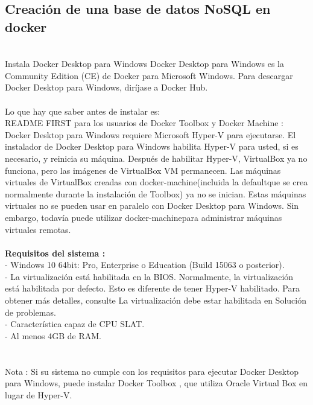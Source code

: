 \documentclass[twoside,onecolumn]{article}
\begin{document}
\begin{flushright}
\begin{itemize}
\subsection{Creación de una base de datos NoSQL en docker}
\textbf{}\\
Instala Docker Desktop para Windows
Docker Desktop para Windows es la Community Edition (CE) de Docker para Microsoft Windows. Para descargar Docker Desktop para Windows, diríjase a Docker Hub.
\textbf{}\\
\textbf{}\\
Lo que hay que saber antes de instalar es: \textbf{}\\
README FIRST para los usuarios de Docker Toolbox y Docker Machine : Docker Desktop para Windows requiere Microsoft Hyper-V para ejecutarse. El instalador de Docker Desktop para Windows habilita Hyper-V para usted, si es necesario, y reinicia su máquina. Después de habilitar Hyper-V, VirtualBox ya no funciona, pero las imágenes de VirtualBox VM permanecen. Las máquinas virtuales de VirtualBox creadas con docker-machine(incluida la defaultque se crea normalmente durante la instalación de Toolbox) ya no se inician. Estas máquinas virtuales no se pueden usar en paralelo con Docker Desktop para Windows. Sin embargo, todavía puede utilizar docker-machinepara administrar máquinas virtuales remotas.
\textbf{}\\
\textbf{}\\
\textbf{Requisitos del sistema :}\\
- Windows 10 64bit: Pro, Enterprise o Education (Build 15063 o posterior).\textbf{}\\
- La virtualización está habilitada en la BIOS. Normalmente, la virtualización está habilitada por defecto. Esto es diferente de tener Hyper-V habilitado. Para obtener más detalles, consulte La virtualización debe estar habilitada en Solución de problemas.\textbf{}\\
- Característica capaz de CPU SLAT.\textbf{}\\
- Al menos 4GB de RAM.\textbf{}\\
\textbf{}\\
\textbf{}\\
Nota : Si su sistema no cumple con los requisitos para ejecutar Docker Desktop para Windows, puede instalar Docker Toolbox , que utiliza Oracle Virtual Box en lugar de Hyper-V.
\textbf{}\\
\textbf{}\\


\end{itemize}
\end{flushright}
\end{document}
